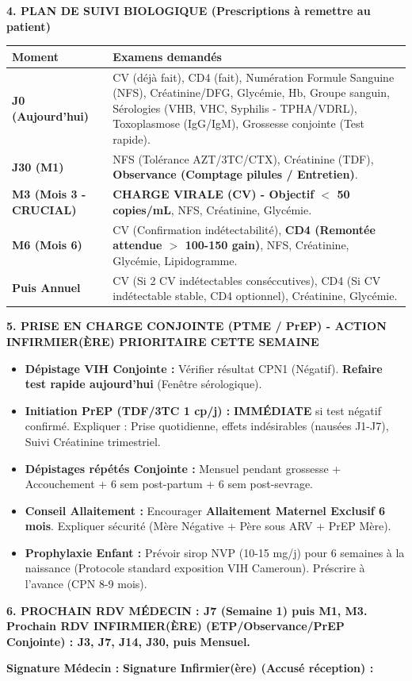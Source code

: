 \documentclass[11pt]{article}
\begin{document}
\begin{exoresolu}
\noindent\textbf{4. PLAN DE SUIVI BIOLOGIQUE (Prescriptions à remettre au patient)}
\begin{center}
\begin{tabularx}{\linewidth}{|l|X|}\hline
\textbf{Moment} & \textbf{Examens demandés} \\ \hline
\textbf{J0 (Aujourd'hui)} & CV (déjà fait), CD4 (fait), Numération Formule Sanguine (NFS), Créatinine/DFG, Glycémie, Hb, Groupe sanguin, Sérologies (VHB, VHC, Syphilis - TPHA/VDRL), Toxoplasmose (IgG/IgM), Grossesse conjointe (Test rapide). \\ \hline
\textbf{J30 (M1)} & NFS (Tolérance AZT/3TC/CTX), Créatinine (TDF), \textbf{Observance (Comptage pilules / Entretien)}. \\ \hline
\textbf{M3 (Mois 3 - CRUCIAL)} & \textbf{CHARGE VIRALE (CV) - Objectif $<$ 50 copies/mL}, NFS, Créatinine, Glycémie. \\ \hline
\textbf{M6 (Mois 6)} & CV (Confirmation indétectabilité), \textbf{CD4 (Remontée attendue $>$ 100-150 gain)}, NFS, Créatinine, Glycémie, Lipidogramme. \\ \hline
\textbf{Puis Annuel} & CV (Si 2 CV indétectables conséccutives), CD4 (Si CV indétectable stable, CD4 optionnel), Créatinine, Glycémie. \\ \hline
\end{tabularx}
\end{center}

\noindent\textbf{5. PRISE EN CHARGE CONJOINTE (PTME / PrEP) - \textbf{ACTION INFIRMIER(ÈRE) PRIORITAIRE CETTE SEMAINE}}
\begin{itemize}
    \item \textbf{Dépistage VIH Conjointe :} Vérifier résultat CPN1 (Négatif). \textbf{Refaire test rapide aujourd'hui} (Fenêtre sérologique).
    \item \textbf{Initiation PrEP (TDF/3TC 1 cp/j) :} \textbf{IMMÉDIATE} si test négatif confirmé. Expliquer : Prise quotidienne, effets indésirables (nausées J1-J7), Suivi Créatinine trimestriel.
    \item \textbf{Dépistages répétés Conjointe :} Mensuel pendant grossesse + Accouchement + 6 sem post-partum + 6 sem post-sevrage.
    \item \textbf{Conseil Allaitement :} Encourager \textbf{Allaitement Maternel Exclusif 6 mois}. Expliquer sécurité (Mère Négative + Père sous ARV + PrEP Mère).
    \item \textbf{Prophylaxie Enfant :} Prévoir sirop NVP (10-15 mg/j) pour 6 semaines à la naissance (Protocole standard exposition VIH Cameroun). Préscrire à l'avance (CPN 8-9 mois).
\end{itemize}

\noindent\textbf{6. PROCHAIN RDV MÉDECIN : \textbf{J7 (Semaine 1)} puis \textbf{M1, M3}.}
\noindent\textbf{Prochain RDV INFIRMIER(ÈRE) (ETP/Observance/PrEP Conjointe) : \textbf{J3, J7, J14, J30, puis Mensuel.}}

\vspace{0.2cm}
\noindent\textbf{Signature Médecin :} \hfill \textbf{Signature Infirmier(ère) (Accusé réception) :}
\end{exoresolu}
\end{document}
